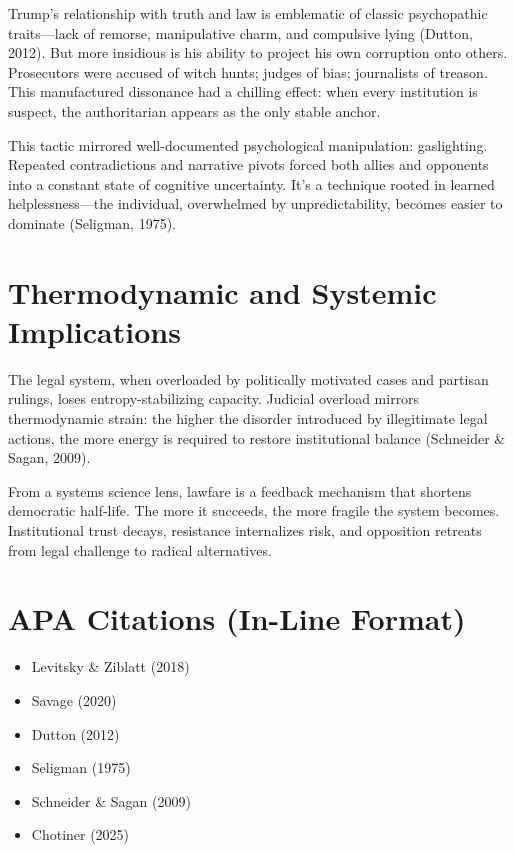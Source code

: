 \documentclass[
]{article}
\providecommand{\tightlist}{%
  \setlength{\itemsep}{0pt}\setlength{\parskip}{0pt}}
\begin{document}
Trump's relationship with truth and law is emblematic of classic psychopathic traits---lack of remorse, manipulative charm, and compulsive lying (Dutton, 2012). But more insidious is his ability to project his own corruption onto others. Prosecutors were accused of witch hunts; judges of bias; journalists of treason. This manufactured dissonance had a chilling effect: when every institution is suspect, the authoritarian appears as the only stable anchor.

This tactic mirrored well-documented psychological manipulation: gaslighting. Repeated contradictions and narrative pivots forced both allies and opponents into a constant state of cognitive uncertainty. It's a technique rooted in learned helplessness---the individual, overwhelmed by unpredictability, becomes easier to dominate (Seligman, 1975).

\section*{Thermodynamic and Systemic Implications}

The legal system, when overloaded by politically motivated cases and partisan rulings, loses entropy-stabilizing capacity. Judicial overload mirrors thermodynamic strain: the higher the disorder introduced by illegitimate legal actions, the more energy is required to restore institutional balance (Schneider \& Sagan, 2009).

From a systems science lens, lawfare is a feedback mechanism that shortens democratic half-life. The more it succeeds, the more fragile the system becomes. Institutional trust decays, resistance internalizes risk, and opposition retreats from legal challenge to radical alternatives.

\section*{APA Citations (In-Line Format)}

\begin{itemize}
\tightlist
\item
  Levitsky \& Ziblatt (2018)
\item
  Savage (2020)
\item
  Dutton (2012)
\item
  Seligman (1975)
\item
  Schneider \& Sagan (2009)
\item
  Chotiner (2025)
\end{itemize}
\end{document}
